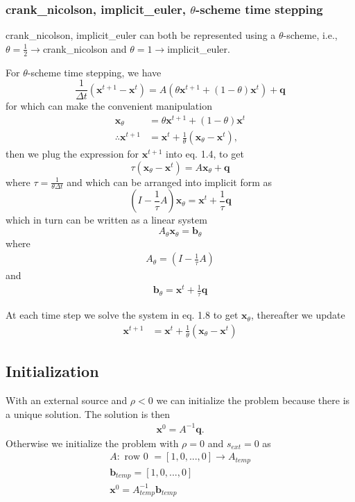 \documentclass[11pt,letterpaper,notitlepage]{article}
\newcommand{\beqn}{\begin{equation}
		\begin{aligned}}
\newcommand{\eeqn}{\end{aligned}
\end{equation}}
\numberwithin{equation}{section}
\begin{document}
\subsubsection{{\ttfamily crank\_nicolson, implicit\_euler}, $\theta$-scheme time stepping}
{\ttfamily crank\_nicolson, implicit\_euler} can both be represented using a $\theta$-scheme, i.e., $\theta = \frac{1}{2} \to ${\ttfamily crank\_nicolson} and $\theta = 1 \to ${\ttfamily implicit\_euler}.


For $\theta$-scheme time stepping, we have
\begin{equation}
	\frac{1}{\Delta t} (\mathbf{x}^{t+1} - \mathbf{x}^t) = A(\theta \mathbf{x}^{t+1} + (1-\theta) \mathbf{x}^{t}) + \mathbf{q}
\end{equation}
for which can make the convenient manipulation
\begin{equation}
\begin{aligned}
	\mathbf{x}_{\theta} &= \theta \mathbf{x}^{t+1} + (1-\theta) \mathbf{x}^{t} \\
	\therefore \mathbf{x}^{t+1} &= \mathbf{x}^t + \frac{1}{\theta} (\mathbf{x}_\theta - \mathbf{x}^t),
\end{aligned}
\end{equation}
then we plug the expression for $\mathbf{x}^{t+1}$ into eq. 1.4, to get
\begin{equation}
	\tau (\mathbf{x}_\theta - \mathbf{x}^t) = A\mathbf{x}_\theta  + \mathbf{q}
\end{equation}
where $\tau = \frac{1}{\theta \Delta t}$ and which can be arranged into implicit form as
\begin{equation}
	(I - \frac{1}{\tau}A)\mathbf{x}_{\theta} = \mathbf{x}^t + \frac{1}{\tau} \mathbf{q}
\end{equation}
which in turn can be written as a linear system
\begin{equation}
	A_{\theta} \mathbf{x}_{\theta} = \mathbf{b}_{\theta}
\end{equation}
where
\beqn
A_\theta = (I - \frac{1}{\tau}A)
\eeqn 
and
\beqn 
\mathbf{b}_{\theta} = \mathbf{x}^t + \frac{1}{\tau} \mathbf{q}
\eeqn 

At each time step we solve the system in eq. 1.8 to get $\mathbf{x}_\theta$, thereafter we update 
\beqn 
\mathbf{x}^{t+1} &= \mathbf{x}^t + \frac{1}{\theta} (\mathbf{x}_\theta - \mathbf{x}^t)
\eeqn 

\subsection{Initialization}
With an external source and $\rho < 0$ we can initialize the problem because there is a unique solution. The solution is then
\beqn 
\mathbf{x}^0  = A^{-1} \mathbf{q}.
\eeqn 
Otherwise we initialize the problem with $\rho = 0$ and $s_{ext} = 0$ as
\beqn 
A: \text{ row 0 } = [1, 0, ..., 0] \to A_{temp} \\
\mathbf{b}_{temp} = [1, 0, ..., 0]\\
\mathbf{x}^0 = A_{temp}^{-1} \mathbf{b}_{temp}
\eeqn 
\end{document}
